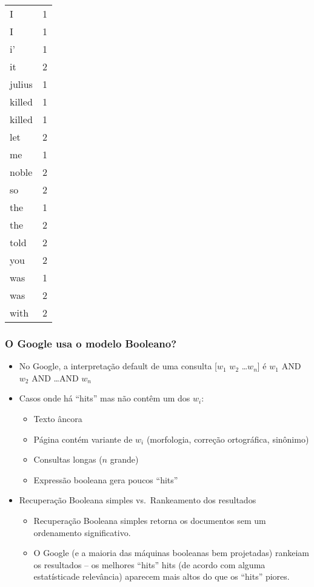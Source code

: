 \documentclass[compress]{beamer}
\begin{document}
\begin{frame}[shrink=55]
{\begin{tabular}{lr}
I & 1 \\
I & 1 \\
i' & 1 \\
it & 2 \\
julius & 1 \\
killed & 1 \\
killed & 1 \\
let & 2 \\
me & 1 \\
noble & 2 \\
so & 2 \\
the & 1 \\
the & 2 \\
told & 2 \\
you & 2 \\
was & 1 \\
was & 2 \\
with & 2
\end{tabular}
}

\end{frame}




\begin{frame}
\frametitle{O Google usa o modelo Booleano?}


\begin{itemize}
\item No Google, a interpretação default de  uma consulta
  [$w_1$ $w_2$ 
\ldots $w_n$] é 
  $w_1$ AND $w_2$ AND 
\ldots AND $w_n$
\item Casos onde há ``hits'' mas não contêm um 
  dos $w_i$:
\begin{itemize}
\item Texto âncora
\item Página contém variante de $w_i$ (morfologia, correção ortográfica, sinônimo)
\item Consultas longas ($n$ grande)
\item Expressão booleana gera poucos ``hits''
\end{itemize}

\item Recuperação Booleana simples vs.\ Rankeamento dos resultados

\begin{itemize}
\item Recuperação Booleana simples retorna os documentos sem um ordenamento significativo.
\item O Google (e a maioria das máquinas booleanas bem projetadas) rankeiam os resultados -- os melhores ``hits'' hits (de acordo com alguma estatísticade relevância) aparecem mais altos do que os ``hits'' piores.
\end{itemize}
\end{itemize}

\end{frame}
\end{document}
